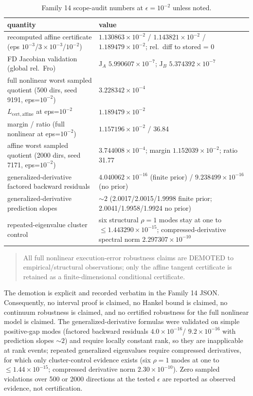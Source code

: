 \documentclass[12pt]{article}
\begin{document}
\begin{table}[htbp]
\centering
\small
\caption{Family 14 scope-audit numbers at $\epsilon=10^{-2}$ unless noted.}
\label{tab:f14}
\begin{tabular}{p{} p{}}
\toprule
quantity & value \\
\midrule
recomputed affine certificate (eps $10^{-3}$/$3\times10^{-3}$/$10^{-2}$) &
$1.130863\times10^{-2}$ / $1.143821\times10^{-2}$ /
$1.189479\times10^{-2}$; rel.\ diff to stored = 0 \\
FD Jacobian validation (global rel.\ Fro) &
J$_A$ $5.990607\times10^{-7}$; J$_B$ $5.374392\times10^{-7}$ \\
full nonlinear worst sampled quotient (500 dirs, seed 9191, eps=$10^{-2}$) &
$3.228342\times10^{-4}$ \\
$L_{\mathrm{cert,affine}}$ at eps=$10^{-2}$ &
$1.189479\times10^{-2}$ \\
margin / ratio (full nonlinear at eps=$10^{-2}$) &
$1.157196\times10^{-2}$ / 36.84 \\
affine worst sampled quotient (2000 dirs, seed 7171, eps=$10^{-2}$) &
$3.744008\times10^{-4}$; margin $1.152039\times10^{-2}$; ratio 31.77 \\
generalized-derivative factored backward residuals &
$4.040062\times10^{-16}$ (finite prior) /
$9.238499\times10^{-16}$ (no prior) \\
generalized-derivative prediction slopes & $\sim2$
(2.0017/2.0015/1.9998 finite prior; 2.0041/1.9958/1.9924 no prior) \\
repeated-eigenvalue cluster control &
six structural $\rho=1$ modes stay at one to $\le1.443290\times10^{-15}$;
compressed-derivative spectral norm $2.297307\times10^{-10}$ \\
\bottomrule
\end{tabular}
\end{table}

\begin{quote}
All full nonlinear execution-error robustness claims are DEMOTED to
empirical/structural observations; only the affine tangent certificate is
retained as a finite-dimensional conditional certificate.
\end{quote}

The demotion is explicit and recorded verbatim in the Family 14 JSON.
Consequently, no interval proof is claimed, no
Hankel bound is claimed, no continuum robustness is claimed, and no certified
robustness for the full nonlinear model is claimed. The generalized-derivative
formulas were validated on simple positive-gap modes (factored backward
residuals $4.0\times10^{-16}$/ $9.2\times10^{-16}$ with prediction slopes
$\sim2$) and require locally constant rank, so they are inapplicable at rank
events; repeated generalized eigenvalues require compressed derivatives, for
which only cluster-control evidence exists (six $\rho=1$ modes at one to
$\le1.44\times10^{-15}$; compressed derivative norm $2.30\times10^{-10}$).
Zero sampled violations over 500 or 2000 directions at the tested $\epsilon$
are reported as observed evidence, not certification.
\end{document}

